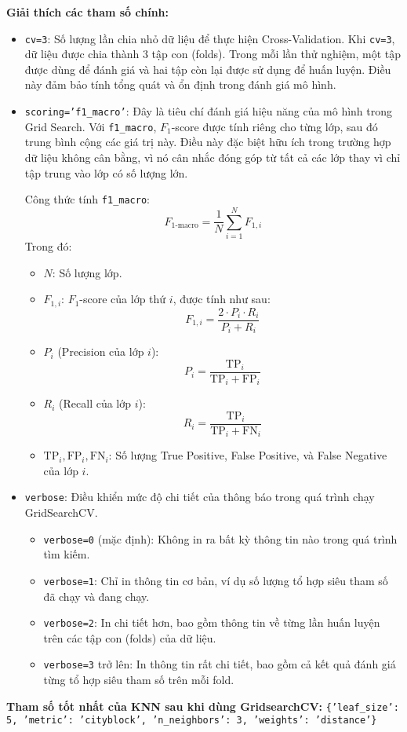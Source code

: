 \documentclass[a4paper,12pt]{article}
\begin{document}
\noindent \textbf{Giải thích các tham số chính:}
\begin{itemize}
    \item \texttt{cv=3}: Số lượng lần chia nhỏ dữ liệu để thực hiện Cross-Validation. Khi \texttt{cv=3}, dữ liệu được chia thành 3 tập con (folds). Trong mỗi lần thử nghiệm, một tập được dùng để đánh giá và hai tập còn lại được sử dụng để huấn luyện. Điều này đảm bảo tính tổng quát và ổn định trong đánh giá mô hình.
    
    \item \texttt{scoring='f1\_macro'}: Đây là tiêu chí đánh giá hiệu năng của mô hình trong Grid Search. Với \texttt{f1\_macro}, $F_{1}$-score được tính riêng cho từng lớp, sau đó trung bình cộng các giá trị này. Điều này đặc biệt hữu ích trong trường hợp dữ liệu không cân bằng, vì nó cân nhắc đóng góp từ tất cả các lớp thay vì chỉ tập trung vào lớp có số lượng lớn.

    \noindent Công thức tính \texttt{f1\_macro}:
    \[
    F_{1\text{-macro}} = \frac{1}{N} \sum_{i=1}^{N} F_{1, i}
    \]
    Trong đó:
    \begin{itemize}
        \item \( N \): Số lượng lớp.
        \item \( F_{1, i} \): $F_{1}$-score của lớp thứ \( i \), được tính như sau:
        \[
        F_{1, i} = \frac{2 \cdot P_{i} \cdot R_{i}}{P_{i} + R_{i}}
        \]
        \item \( P_{i} \) (Precision của lớp \( i \)): 
        \[
        P_{i} = \frac{\text{TP}_{i}}{\text{TP}_{i} + \text{FP}_{i}}
        \]
        \item \( R_{i} \) (Recall của lớp \( i \)): 
        \[
        R_{i} = \frac{\text{TP}_{i}}{\text{TP}_{i} + \text{FN}_{i}}
        \]
        \item \( \text{TP}_{i}, \text{FP}_{i}, \text{FN}_{i} \): Số lượng True Positive, False Positive, và False Negative của lớp \( i \).
    \end{itemize}

    \item \texttt{verbose}: Điều khiển mức độ chi tiết của thông báo trong quá trình chạy GridSearchCV. 
    \begin{itemize}
        \item \texttt{verbose=0} (mặc định): Không in ra bất kỳ thông tin nào trong quá trình tìm kiếm.
        \item \texttt{verbose=1}: Chỉ in thông tin cơ bản, ví dụ số lượng tổ hợp siêu tham số đã chạy và đang chạy.
        \item \texttt{verbose=2}: In chi tiết hơn, bao gồm thông tin về từng lần huấn luyện trên các tập con (folds) của dữ liệu.
        \item \texttt{verbose=3} trở lên: In thông tin rất chi tiết, bao gồm cả kết quả đánh giá từng tổ hợp siêu tham số trên mỗi fold.
    \end{itemize}
\end{itemize}
\noindent \textbf{Tham số tốt nhất của KNN sau khi dùng GridsearchCV:} \texttt{\{'leaf\_size': 5, 'metric': 'cityblock', 'n\_neighbors': 3, 'weights': 'distance'\}}
\end{document}
